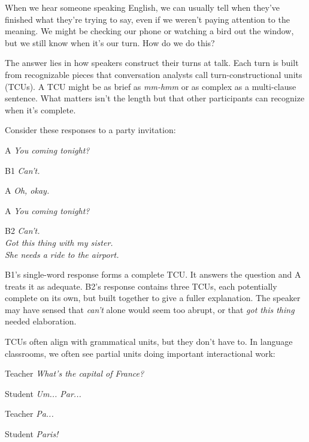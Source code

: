 When we hear someone speaking English, we can usually tell when they've finished what they're trying to say, even if we weren't paying attention to the meaning. We might be checking our phone or watching a bird out the window, but we still know when it's our turn. How do we do this?

The answer lies in how speakers construct their turns at talk. Each turn is built from recognizable pieces that conversation analysts call turn-constructional units (TCUs). A TCU might be as brief as \textit{mm-hmm} or as complex as a multi-clause sentence. What matters isn't the length but that other participants can recognize when it's complete.

Consider these responses to a party invitation:

\ea
\begin{dialogue}
\item[A] \textit{You coming tonight?}
\item[B1] \textit{Can't.}
\item[A] \textit{Oh, okay.}
\end{dialogue}
\z

\ea
\begin{dialogue}
\item[A] \textit{You coming tonight?}
\item[B2] \textit{Can't.} \\
    \textit{Got this thing with my sister.} \\
    \textit{She needs a ride to the airport.}
\end{dialogue}
\z

B1's single-word response forms a complete TCU. It answers the question and A treats it as adequate. B2's response contains three TCUs, each potentially complete on its own, but built together to give a fuller explanation. The speaker may have sensed that \textit{can't} alone would seem too abrupt, or that \textit{got this thing} needed elaboration.

TCUs often align with grammatical units, but they don't have to. In language classrooms, we often see partial units doing important interactional work:

\ea
\begin{dialogue}
\item[Teacher] \textit{What's the capital of France?}
\item[Student] \textit{Um... Par...}
\item[Teacher] \textit{Pa...}
\item[Student] \textit{Paris!}
\end{dialogue}
\z

